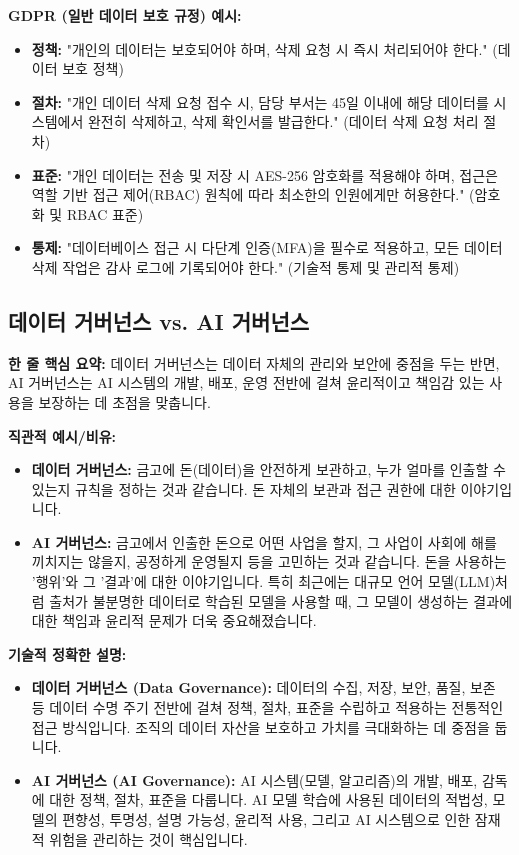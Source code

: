 \documentclass[11pt,a4paper]{article}
\theoremstyle{definition}
\begin{document}
\begin{examplebox}
\textbf{GDPR (일반 데이터 보호 규정) 예시:}
\begin{itemize}
    \item \textbf{정책:} "개인의 데이터는 보호되어야 하며, 삭제 요청 시 즉시 처리되어야 한다." (데이터 보호 정책)
    \item \textbf{절차:} "개인 데이터 삭제 요청 접수 시, 담당 부서는 45일 이내에 해당 데이터를 시스템에서 완전히 삭제하고, 삭제 확인서를 발급한다." (데이터 삭제 요청 처리 절차)
    \item \textbf{표준:} "개인 데이터는 전송 및 저장 시 AES-256 암호화를 적용해야 하며, 접근은 역할 기반 접근 제어(RBAC) 원칙에 따라 최소한의 인원에게만 허용한다." (암호화 및 RBAC 표준)
    \item \textbf{통제:} "데이터베이스 접근 시 다단계 인증(MFA)을 필수로 적용하고, 모든 데이터 삭제 작업은 감사 로그에 기록되어야 한다." (기술적 통제 및 관리적 통제)
\end{itemize}
\end{examplebox}

\newpage
\subsection*{데이터 거버넌스 vs. AI 거버넌스}

\begin{keyconceptbox}
\textbf{한 줄 핵심 요약:} 데이터 거버넌스는 데이터 자체의 관리와 보안에 중점을 두는 반면, AI 거버넌스는 AI 시스템의 개발, 배포, 운영 전반에 걸쳐 윤리적이고 책임감 있는 사용을 보장하는 데 초점을 맞춥니다.
\end{keyconceptbox}

\textbf{직관적 예시/비유:}
\begin{itemize}
    \item \textbf{데이터 거버넌스:} 금고에 돈(데이터)을 안전하게 보관하고, 누가 얼마를 인출할 수 있는지 규칙을 정하는 것과 같습니다. 돈 자체의 보관과 접근 권한에 대한 이야기입니다.
    \item \textbf{AI 거버넌스:} 금고에서 인출한 돈으로 어떤 사업을 할지, 그 사업이 사회에 해를 끼치지는 않을지, 공정하게 운영될지 등을 고민하는 것과 같습니다. 돈을 사용하는 '행위'와 그 '결과'에 대한 이야기입니다. 특히 최근에는 대규모 언어 모델(LLM)처럼 출처가 불분명한 데이터로 학습된 모델을 사용할 때, 그 모델이 생성하는 결과에 대한 책임과 윤리적 문제가 더욱 중요해졌습니다.
\end{itemize}

\textbf{기술적 정확한 설명:}
\begin{itemize}
    \item \textbf{데이터 거버넌스 (Data Governance):} 데이터의 수집, 저장, 보안, 품질, 보존 등 데이터 수명 주기 전반에 걸쳐 정책, 절차, 표준을 수립하고 적용하는 전통적인 접근 방식입니다. 조직의 데이터 자산을 보호하고 가치를 극대화하는 데 중점을 둡니다.
    \item \textbf{AI 거버넌스 (AI Governance):} AI 시스템(모델, 알고리즘)의 개발, 배포, 감독에 대한 정책, 절차, 표준을 다룹니다. AI 모델 학습에 사용된 데이터의 적법성, 모델의 편향성, 투명성, 설명 가능성, 윤리적 사용, 그리고 AI 시스템으로 인한 잠재적 위험을 관리하는 것이 핵심입니다.
\end{itemize}
\end{document}
